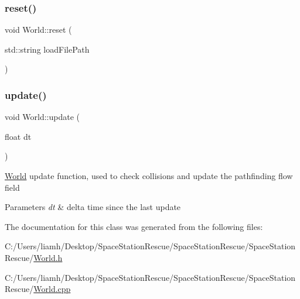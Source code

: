 \subsubsection{\texorpdfstring{reset()}{reset()}}
{\footnotesize\ttfamily void World\+::reset (\begin{DoxyParamCaption}\item[{std\+::string}]{load\+File\+Path }\end{DoxyParamCaption})}

\mbox{\label{class_world_a26a44f3778d66147edf6636472c166ba}} 
\subsubsection{\texorpdfstring{update()}{update()}}
{\footnotesize\ttfamily void World\+::update (\begin{DoxyParamCaption}\item[{float}]{dt }\end{DoxyParamCaption})}



\mbox{\hyperlink{class_world}{World}} update function, used to check collisions and update the pathfinding flow field 


\begin{DoxyParams}{Parameters}
{\em dt} & delta time since the last update\\
\hline
\end{DoxyParams}


The documentation for this class was generated from the following files\+:\begin{DoxyCompactItemize}
\item 
C\+:/\+Users/liamh/\+Desktop/\+Space\+Station\+Rescue/\+Space\+Station\+Rescue/\+Space\+Station\+Rescue/\mbox{\hyperlink{_world_8h}{World.\+h}}\item 
C\+:/\+Users/liamh/\+Desktop/\+Space\+Station\+Rescue/\+Space\+Station\+Rescue/\+Space\+Station\+Rescue/\mbox{\hyperlink{_world_8cpp}{World.\+cpp}}\end{DoxyCompactItemize}
